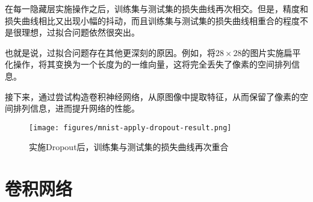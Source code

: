 \begin{content}
在每一隐藏层实施操作之后，训练集与测试集的损失曲线再次相交。但是，精度和损失曲线相比又出现小幅的抖动，而且训练集与测试集的损失曲线相重合的程度不是很理想，过拟合问题依然很突出。

也就是说，过拟合问题存在其他更深刻的原因。例如，将$ 28 \times 28 $的图片实施扁平化操作，将其变换为一个长度为的一维向量，这将完全丢失了像素的空间排列信息。

接下来，通过尝试构造卷积神经网络，从原图像中提取特征，从而保留了像素的空间排列信息，进而提升网络的性能。

\begin{figure}[H]
\centering
\texttt{[image: figures/mnist-apply-dropout-result.png]}
\caption{实施Dropout后，训练集与测试集的损失曲线再次重合}
 \label{fig:mnist-apply-dropout-result}
\end{figure}

\end{content}

\section{卷积网络}

